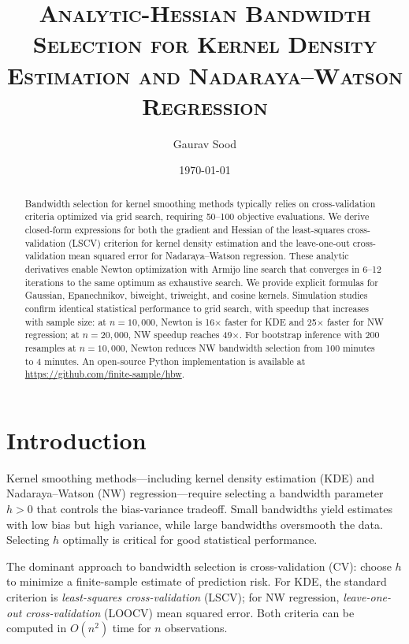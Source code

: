 \documentclass[11pt]{article}
\title{\scshape Analytic-Hessian Bandwidth Selection for Kernel Density Estimation and Nadaraya--Watson Regression}
\author{Gaurav Sood}
\date{\today}
\theoremstyle{definition}
\theoremstyle{remark}
\begin{document}
\maketitle

\begin{abstract}
Bandwidth selection for kernel smoothing methods typically relies on cross-validation criteria optimized via grid search, requiring 50--100 objective evaluations.
We derive closed-form expressions for both the gradient and Hessian of the least-squares cross-validation (LSCV) criterion for kernel density estimation and the leave-one-out cross-validation mean squared error for Nadaraya--Watson regression.
These analytic derivatives enable Newton optimization with Armijo line search that converges in 6--12 iterations to the same optimum as exhaustive search.
We provide explicit formulas for Gaussian, Epanechnikov, biweight, triweight, and cosine kernels.
Simulation studies confirm identical statistical performance to grid search, with speedup that increases with sample size: at $n=10{,}000$, Newton is 16$\times$ faster for KDE and 25$\times$ faster for NW regression; at $n=20{,}000$, NW speedup reaches 49$\times$.
For bootstrap inference with 200 resamples at $n=10{,}000$, Newton reduces NW bandwidth selection from 100 minutes to 4 minutes.
An open-source Python implementation is available at \url{https://github.com/finite-sample/hbw}.
\end{abstract}

\section{Introduction}
\label{sec:intro}

Kernel smoothing methods---including kernel density estimation (KDE) and Nadaraya--Watson (NW) regression---require selecting a bandwidth parameter $h > 0$ that controls the bias-variance tradeoff.
Small bandwidths yield estimates with low bias but high variance, while large bandwidths oversmooth the data.
Selecting $h$ optimally is critical for good statistical performance.

The dominant approach to bandwidth selection is cross-validation (CV): choose $h$ to minimize a finite-sample estimate of prediction risk.
For KDE, the standard criterion is \emph{least-squares cross-validation} (LSCV); for NW regression, \emph{leave-one-out cross-validation} (LOOCV) mean squared error.
Both criteria can be computed in $O(n^2)$ time for $n$ observations.
\end{document}
